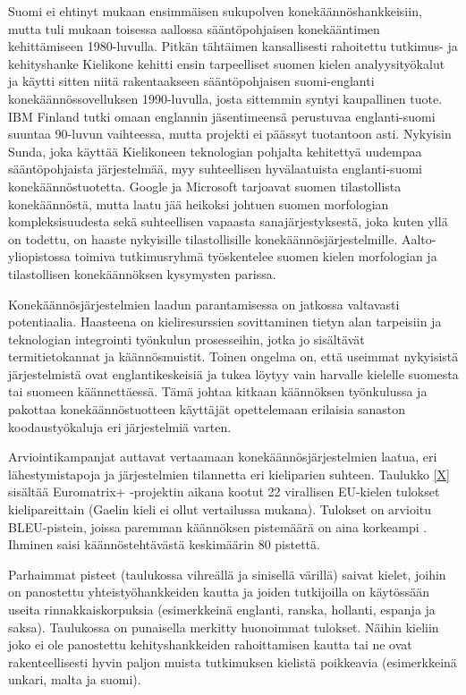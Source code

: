 \documentclass{../../metanetpaper}
\begin{document}
\begin{Parallel}[c]{79mm}{78mm}
{Suomi ei ehtinyt mukaan ensimmäisen sukupolven konekäännöshankkeisiin,
mutta tuli mukaan toisessa aallossa sääntöpohjaisen konekääntimen
kehittämiseen 1980-luvulla. Pitkän tähtäimen kansallisesti rahoitettu
tutkimus- ja kehityshanke Kielikone kehitti ensin tarpeelliset suomen
kielen analyysityökalut ja käytti sitten niitä rakentaakseen
sääntöpohjaisen suomi-englanti konekäännössovelluksen 1990-luvulla,
josta sittemmin syntyi kaupallinen tuote. IBM Finland tutki omaan
englannin jäsentimeensä perustuvaa englanti-suomi suuntaa 90-luvun
vaihteessa, mutta projekti ei päässyt tuotantoon asti. Nykyisin Sunda,
joka käyttää Kielikoneen teknologian pohjalta kehitettyä uudempaa
sääntöpohjaista järjestelmää, myy suhteellisen hyvälaatuista
englanti-suomi konekäännöstuotetta. Google ja Microsoft tarjoavat
suomen tilastollista konekäännöstä, mutta laatu jää heikoksi johtuen
suomen morfologian kompleksisuudesta sekä suhteellisen vapaasta
sanajärjestyksestä, joka kuten yllä on todettu, on haaste nykyisille
tilastollisille konekäännösjärjestelmille. Aalto-yliopistossa toimiva
tutkimusryhmä työskentelee suomen kielen morfologian ja tilastollisen
konekäännöksen kysymysten parissa.

Konekäännösjärjestelmien laadun parantamisessa on jatkossa valtavasti
potentiaalia. Haasteena on kieliresurssien sovittaminen tietyn alan
tarpeisiin ja teknologian integrointi työnkulun prosesseihin, jotka jo
sisältävät termitietokannat ja käännösmuistit. Toinen ongelma on, että
useimmat nykyisistä järjestelmistä ovat englantikeskeisiä ja tukea
löytyy vain harvalle kielelle suomesta tai suomeen käännettäessä. Tämä
johtaa kitkaan käännöksen työnkulussa ja pakottaa konekäännöstuotteen
käyttäjät opettelemaan erilaisia sanaston koodaustyökaluja eri
järjestelmiä varten.

Arviointikampanjat auttavat vertaamaan konekäännösjärjestelmien
laatua, eri lähestymistapoja ja järjestelmien tilannetta eri
kieliparien suhteen. Taulukko \ref{X} sisältää Euromatrix+ -projektin aikana 
kootut 22 virallisen EU-kielen tulokset kielipareittain (Gaelin kieli ei ollut 
vertailussa mukana). Tulokset on arvioitu BLEU-pistein, joissa paremman 
käännöksen pistemäärä on aina korkeampi \cite{BLEU}. Ihminen saisi käännöstehtävästä
keskimäärin 80 pistettä.

Parhaimmat pisteet (taulukossa vihreällä ja sinisellä värillä) saivat
kielet, joihin on panostettu yhteistyöhankkeiden kautta ja joiden
tutkijoilla on käytössään useita rinnakkaiskorpuksia (esimerkkeinä
englanti, ranska, hollanti, espanja ja saksa). Taulukossa on
punaisella merkitty huonoimmat tulokset.  Näihin kieliin joko ei ole
panostettu kehityshankkeiden rahoittamisen kautta tai ne ovat
rakenteellisesti hyvin paljon muista tutkimuksen kielistä poikkeavia
(esimerkkeinä unkari, malta ja suomi).


}
\end{Parallel}
\end{document}

